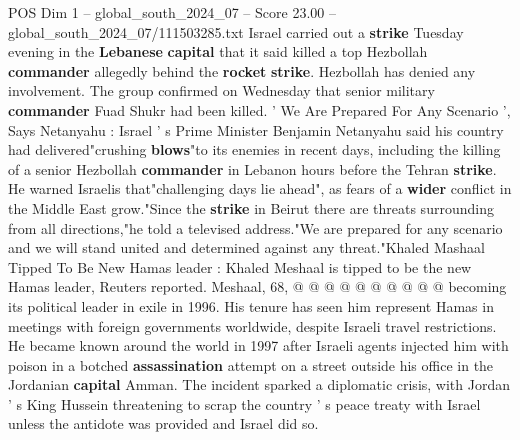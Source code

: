 \begin{textsample}{POS Dim 1 – global\_south\_2024\_07 – Score 23.00 – global\_south\_2024\_07/111503285.txt}
Israel carried out a \textbf{strike} Tuesday evening in the \textbf{Lebanese} \textbf{capital} that it said killed a top Hezbollah \textbf{commander} allegedly behind the \textbf{rocket} \textbf{strike}.
Hezbollah has denied any involvement.
The group confirmed on Wednesday that senior military \textbf{commander} Fuad Shukr had been killed. ' We Are Prepared For Any Scenario ', Says Netanyahu : Israel ' s Prime Minister Benjamin Netanyahu said his country had delivered"crushing \textbf{blows}"to its enemies in recent days, including the killing of a senior Hezbollah \textbf{commander} in Lebanon hours before the Tehran \textbf{strike}.
He warned Israelis that"challenging days lie ahead", as fears of a \textbf{wider} conflict in the Middle East grow."Since the \textbf{strike} in Beirut there are threats surrounding from all directions,"he told a televised address."We are prepared for any scenario and we will stand united and determined against any threat."Khaled Mashaal Tipped To Be New Hamas leader : Khaled Meshaal is tipped to be the new Hamas leader, Reuters reported.
Meshaal, 68, @ @ @ @ @ @ @ @ @ @ becoming its political leader in exile in 1996.
His tenure has seen him represent Hamas in meetings with foreign governments worldwide, despite Israeli travel restrictions.
He became known around the world in 1997 after Israeli agents injected him with poison in a botched \textbf{assassination} attempt on a street outside his office in the Jordanian \textbf{capital} Amman.
The incident sparked a diplomatic crisis, with Jordan ' s King Hussein threatening to scrap the country ' s peace treaty with Israel unless the antidote was provided and Israel did so.

\end{textsample}

